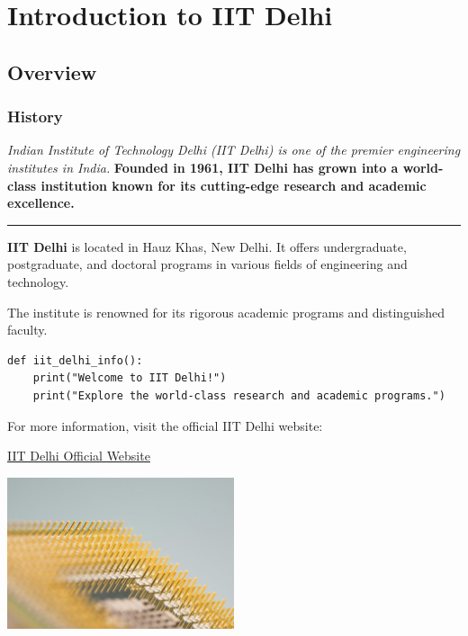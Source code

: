 \documentclass{article}
\begin{document}

\section{Introduction to IIT Delhi}
\subsection{Overview}
\subsubsection{History} %

\textit{Indian Institute of Technology Delhi (IIT Delhi) is one of the premier engineering institutes in India.}
\textbf{Founded in 1961, IIT Delhi has grown into a world-class institution known for its cutting-edge research and academic excellence.}

\hrule %

\textbf{IIT Delhi} is located in Hauz Khas, New Delhi. It offers undergraduate, postgraduate, and doctoral programs in various fields of engineering and technology.\par
The institute is renowned for its rigorous academic programs and distinguished faculty.

\begin{verbatim}
def iit_delhi_info():
    print("Welcome to IIT Delhi!")
    print("Explore the world-class research and academic programs.")
\end{verbatim}

For more information, visit the official IIT Delhi website: 

\href{https://www.iitd.ac.in}{IIT Delhi Official Website}

\includegraphics[width=0.5\textwidth]{images/technology.jpg}
\end{document}
